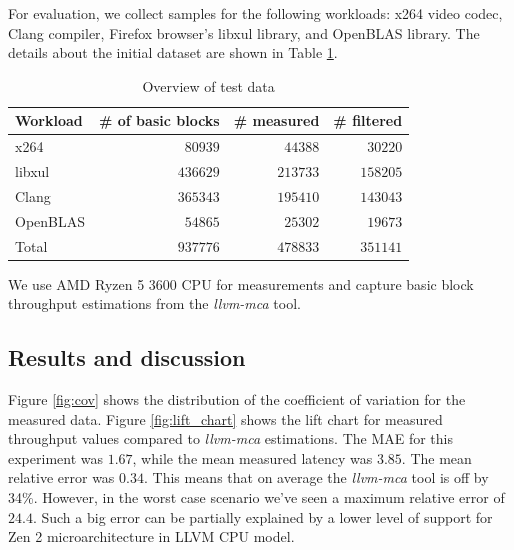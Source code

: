 For evaluation, we collect samples for the following workloads: x264 video codec, Clang compiler, 
Firefox browser's libxul library, and OpenBLAS library. The details about the initial dataset are 
shown in Table \ref{tab:test_data}.

\begin{table}[htbp]
  \caption{Overview of test data}
  \label{tab:test_data}
  \begin{tabular}{lrrr}
  \hline
  Workload & \# of basic blocks & \# measured & \# filtered \\
  \hline
  x264     & $80939$              & $44388$       & $30220$       \\
  libxul   & $436629$             & $213733$      & $158205$      \\
  Clang    & $365343$             & $195410$      & $143043$      \\
  OpenBLAS & $54865$              & $25302$       & $19673$       \\
  Total    & $937776$             & $478833$      & $351141$
  \end{tabular}
\end{table}

We use AMD Ryzen 5 3600 CPU for measurements and capture basic block throughput
estimations from the \textit{llvm-mca} tool.

\subsection{Results and discussion}
Figure \ref{fig:cov} shows the distribution of the coefficient of variation for
the measured data. Figure \ref{fig:lift_chart} shows the lift chart for measured
throughput values compared to \textit{llvm-mca} estimations. The MAE for this
experiment was $1.67$, while the mean measured latency was $3.85$. The mean relative
error was $0.34$. This means that on average the \textit{llvm-mca} tool is off by 34\%.
However, in the worst case scenario we've seen a maximum relative error of $24.4$.
Such a big error can be partially explained by a lower level of support for Zen 2
microarchitecture in LLVM CPU model.

